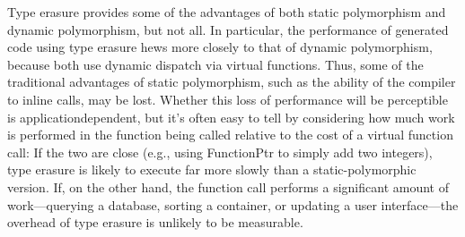 Type erasure provides some of the advantages of both static polymorphism and dynamic polymorphism, but not all. In particular, the performance of generated code using type erasure hews more closely to that of dynamic polymorphism, because both use dynamic dispatch via virtual functions. Thus, some of the traditional advantages of static polymorphism, such as the ability of the compiler to inline calls, may be lost. Whether this loss of performance will be perceptible is applicationdependent, but it’s often easy to tell by considering how much work is performed in the function being called relative to the cost of a virtual function call: If the two are close (e.g., using FunctionPtr to simply add two integers), type erasure is likely to execute far more slowly than a static-polymorphic version. If, on the other hand, the function call performs a significant amount of work—querying a database, sorting a container, or updating a user interface—the overhead of type erasure is unlikely to be measurable.